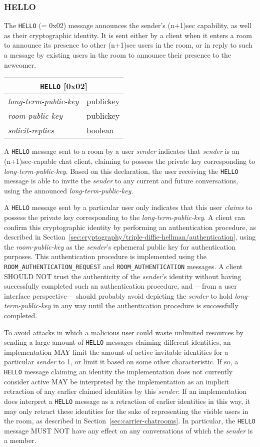 \documentclass{article}
\def\message#1{\texttt{#1}}
\def\field#1{\textit{#1}}
\def\type#1{\textsf{#1}}
\newenvironment{basicmessage}[2]{
\newcommand{\messagefield}[2]{
\field{##1} & \type{##2} \\
\hline
}
\hspace{2em minus 2em}\begin{tabular}{|l|l|}
\hline
\multicolumn{2}{|c|}{\message{#1} [#2]} \\
\hline
\hline
}{
\end{tabular}
}
\begin{document}
\subsubsection{HELLO}
\label{sec:messages/hello}

The \message{HELLO} (= 0x02) message announces the sender's (n+1)sec capability, as well as their cryptographic identity.
It is sent either by a client when it enters a room to announce its presence to other (n+1)sec users in the room, or in reply to such a message by existing users in the room to announce their presence to the newcomer.

\begin{basicmessage}{HELLO}{0x02}
\messagefield{long-term-public-key}{publickey}
\messagefield{room-public-key}{publickey}
\messagefield{solicit-replies}{boolean}
\end{basicmessage}

A \message{HELLO} message sent to a room by a user \field{sender} indicates that \field{sender} is an (n+1)sec-capable chat client, claiming to possess the private key corresponding to \field{long-term-public-key}.
Based on this declaration, the user receiving the \message{HELLO} message is able to invite the \field{sender} to any current and future conversations, using the announced \field{long-term-public-key}.

A \message{HELLO} message sent by a particular user only indicates that this user \emph{claims} to possess the private key corresponding to the \field{long-term-public-key}.
A client can confirm this cryptographic identity by performing an authentication procedure, as described in Section~\ref{sec:cryptography/triple-diffie-hellman/authentication}, using the \field{room-public-key} as the \field{sender}'s ephemeral public key for authentication purposes.
This authentication procedure is implemented using the \message{ROOM\_AUTHENTICATION\_REQUEST} and \message{ROOM\_AUTHENTICATION} messages.
A client SHOULD NOT trust the authenticity of the \field{sender}'s identity without having successfully completed such an authentication procedure, and ---from a user interface perspective--- should probably avoid depicting the \field{sender} to hold \field{long-term-public-key} in any way until the authentication procedure is successfully completed.

To avoid attacks in which a malicious user could waste unlimited resources by sending a large amount of \message{HELLO} messages claiming different identities, an implementation MAY limit the amount of active invitable identities for a particular \field{sender} to 1, or limit it based on some other characteristic.
If so, a \message{HELLO} message claiming an identity the implementation does not currently consider active MAY be interpreted by the implementation as an implicit retraction of any earlier claimed identities by this \field{sender}.
If an implementation does interpret a \message{HELLO} message as a retraction of earlier identities in this way, it may only retract these identities for the sake of representing the visible users in the room, as described in Section~\ref{sec:carrier-chatrooms}.
In particular, the \message{HELLO} message MUST NOT have any effect on any conversations of which the \field{sender} is a member.
\end{document}
